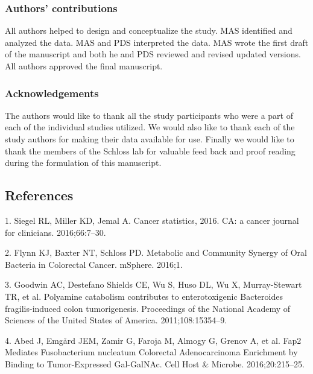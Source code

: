 \documentclass[12pt,]{article}
\begin{document}
\subsubsection{Authors' contributions}\label{authors-contributions}

All authors helped to design and conceptualize the study. MAS identified
and analyzed the data. MAS and PDS interpreted the data. MAS wrote the
first draft of the manuscript and both he and PDS reviewed and revised
updated versions. All authors approved the final manuscript.

\subsubsection{Acknowledgements}\label{acknowledgements}

The authors would like to thank all the study participants who were a
part of each of the individual studies utilized. We would also like to
thank each of the study authors for making their data available for use.
Finally we would like to thank the members of the Schloss lab for
valuable feed back and proof reading during the formulation of this
manuscript.

\newpage

\subsection{References}\label{references}

\hypertarget{refs}{}
\hypertarget{ref-siegel_cancer_2016}{}
1. Siegel RL, Miller KD, Jemal A. Cancer statistics, 2016. CA: a cancer
journal for clinicians. 2016;66:7--30.

\hypertarget{ref-flynn_metabolic_2016}{}
2. Flynn KJ, Baxter NT, Schloss PD. Metabolic and Community Synergy of
Oral Bacteria in Colorectal Cancer. mSphere. 2016;1.

\hypertarget{ref-goodwin_polyamine_2011}{}
3. Goodwin AC, Destefano Shields CE, Wu S, Huso DL, Wu X, Murray-Stewart
TR, et al. Polyamine catabolism contributes to enterotoxigenic
Bacteroides fragilis-induced colon tumorigenesis. Proceedings of the
National Academy of Sciences of the United States of America.
2011;108:15354--9.

\hypertarget{ref-abed_fap2_2016}{}
4. Abed J, Emgård JEM, Zamir G, Faroja M, Almogy G, Grenov A, et al.
Fap2 Mediates Fusobacterium nucleatum Colorectal Adenocarcinoma
Enrichment by Binding to Tumor-Expressed Gal-GalNAc. Cell Host \&
Microbe. 2016;20:215--25.
\end{document}
